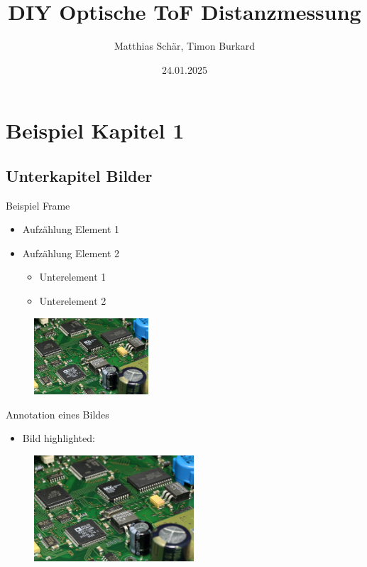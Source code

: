 \documentclass[aspectratio=169]{beamer}
\title{DIY Optische ToF Distanzmessung}
\author{Matthias Schär, Timon Burkard}
\institute{OST -- Ostschweizer Fachhochschule}
\date{24.01.2025}
\begin{document}





\section{Beispiel Kapitel 1}

\subsection{Unterkapitel Bilder}

\begin{frame}{Beispiel Frame}
    \begin{itemize}
        \item Aufzählung Element 1
        \item<2-> Aufzählung Element 2
        \begin{itemize}
            \item Unterelement 1
            \item Unterelement 2
        \end{itemize}
    \end{itemize}

    {
        \begin{figure}
            \includegraphics[width=0.38\textwidth]{graphics/example.jpg}
        \end{figure}
    }
\end{frame}

\begin{frame}{Annotation eines Bildes}
    \begin{itemize}
        \item Bild highlighted:
    \end{itemize}

    {
        \begin{figure}
            \includegraphics[width=0.53\textwidth]{graphics/example.jpg}
        \end{figure}
    }

    {
    }
\end{frame}
\end{document}
